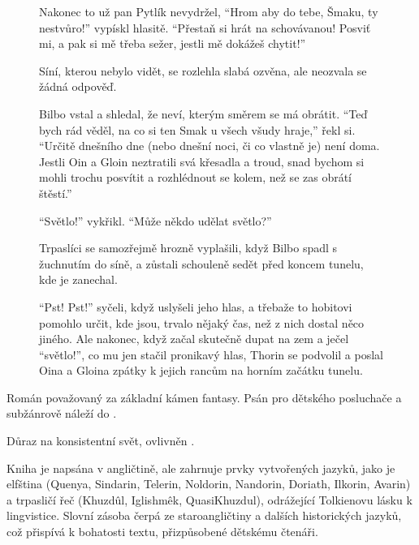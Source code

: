 \documentclass[FGBook.tex]{subfiles}
\begin{document}
\changefontsize{8.7pt}


\noindent\begin{figure}
\tiny

\setlength{\parindent}{3pt}
Nakonec to už pan Pytlík nevydržel,
\enquote{Hrom aby do tebe, Šmaku, ty nestvůro!} vypískl hlasitě.
\enquote{Přestaň si hrát na schovávanou!
Posviť mi, a pak si mě třeba sežer, jestli mě dokážeš chytit!}\par
Síní, kterou nebylo vidět, se rozlehla slabá ozvěna, ale neozvala se žádná odpověď.\par
Bilbo vstal a shledal, že neví, kterým směrem se má obrátit.
\enquote{Teď bych rád věděl, na co si ten Smak u všech všudy hraje,} řekl si. 
\enquote{Určitě dnešního dne (nebo dnešní noci, či co vlastně je) není doma.
Jestli Oin a Gloin neztratili svá křesadla a troud,
snad bychom si mohli trochu posvítit a rozhlédnout se kolem, než se zas obrátí štěstí.}\par
\enquote{Světlo!} vykřikl. \enquote{Může někdo udělat světlo?}\par
Trpaslíci se samozřejmě hrozně vyplašili, když Bilbo spadl s žuchnutím do síně,
a zůstali schouleně sedět před koncem tunelu, kde je zanechal.\par
\enquote{Pst! Pst!} syčeli, když uslyšeli jeho hlas,
a třebaže to hobitovi pomohlo určit, kde jsou, trvalo nějaký čas,
než z nich dostal něco jiného.
Ale nakonec, když začal skutečně dupat na zem a ječel \enquote{světlo!},
co mu jen stačil pronikavý hlas, Thorin se podvolil
a poslal Oina a Gloina zpátky k jejich rancům na horním začátku tunelu.\par
\end{figure}


\noindent Román považovaný za základní kámen fantasy.
Psán pro dětského posluchače a subžánrově náleží do .

\noindent Důraz na konsistentní svět, ovlivněn .

\noindent Kniha je napsána v angličtině, ale zahrnuje prvky vytvořených jazyků,
jako je elfština (Quenya, Sindarin, Telerin, Noldorin, Nandorin, Doriath, Ilkorin, Avarin)
a trpasličí řeč (Khuzdûl, Iglishmêk, QuasiKhuzdul), odrážející Tolkienovu lásku k lingvistice.
Slovní zásoba čerpá ze staroangličtiny a dalších historických jazyků, což přispívá k bohatosti textu,
přizpůsobené dětskému čtenáři.
\end{document}
